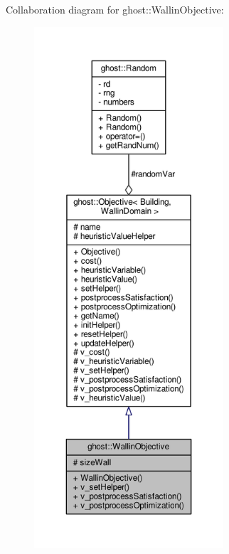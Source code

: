 Collaboration diagram for ghost\-:\-:Wallin\-Objective\-:\nopagebreak
\begin{figure}[H]
\begin{center}
\leavevmode
\includegraphics[height=550pt]{classghost_1_1WallinObjective__coll__graph}
\end{center}
\end{figure}
